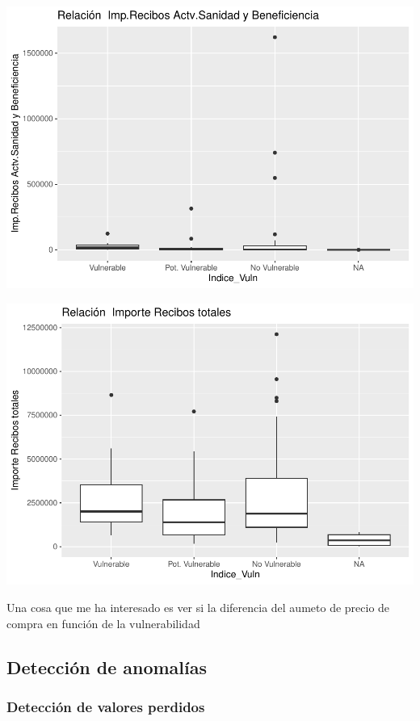 \documentclass[notspecified,article,submit,moreauthors,pdftex]{Definitions/mdpi}
\begin{document}
\begin{center}\includegraphics{./figure/unnamed-chunk-23-32} \end{center}

\begin{center}\includegraphics{./figure/unnamed-chunk-23-33} \end{center}

Una cosa que me ha interesado es ver si la diferencia del aumeto de
precio de compra en función de la vulnerabilidad

\hypertarget{detecciuxf3n-de-anomaluxedas}{%
\subsection{Detección de anomalías}\label{detecciuxf3n-de-anomaluxedas}}

\hypertarget{detecciuxf3n-de-valores-perdidos}{%
\subsubsection{Detección de valores
perdidos}\label{detecciuxf3n-de-valores-perdidos}}
\end{document}
